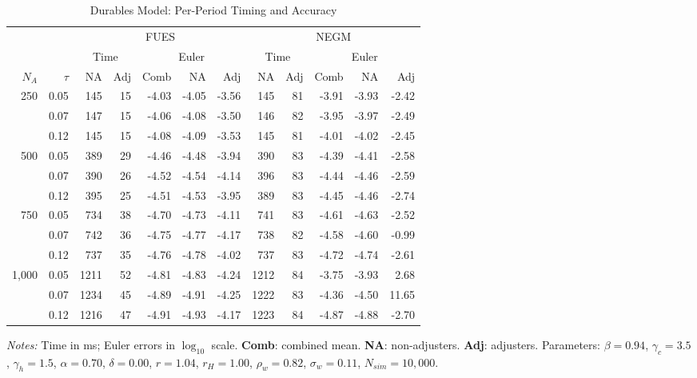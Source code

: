 \documentclass{article}
\begin{document}
\begin{table}[htbp]
\centering
\begingroup
\small
\setlength{\tabcolsep}{3pt}
\renewcommand{\arraystretch}{1.05}
\caption{Durables Model: Per-Period Timing and Accuracy}
\label{table:housing1}
\begin{tabular}{@{}rr rrrrr rrrrr@{}}
\toprule
& & \multicolumn{5}{c}{FUES} & \multicolumn{5}{c}{NEGM} \\
\cmidrule(lr){3-7} \cmidrule(lr){8-12}
& & \multicolumn{2}{c}{Time} & \multicolumn{3}{c}{Euler} & \multicolumn{2}{c}{Time} & \multicolumn{3}{c}{Euler} \\
\cmidrule(lr){3-4} \cmidrule(lr){5-7} \cmidrule(lr){8-9} \cmidrule(lr){10-12}
$N_A$ & $\tau$ & NA & Adj & Comb & NA & Adj & NA & Adj & Comb & NA & Adj \\
\midrule
250 & 0.05 & 145 & 15 & -4.03 & -4.05 & -3.56 & 145 & 81 & -3.91 & -3.93 & -2.42 \\
 & 0.07 & 147 & 15 & -4.06 & -4.08 & -3.50 & 146 & 82 & -3.95 & -3.97 & -2.49 \\
 & 0.12 & 145 & 15 & -4.08 & -4.09 & -3.53 & 145 & 81 & -4.01 & -4.02 & -2.45 \\
\midrule
500 & 0.05 & 389 & 29 & -4.46 & -4.48 & -3.94 & 390 & 83 & -4.39 & -4.41 & -2.58 \\
 & 0.07 & 390 & 26 & -4.52 & -4.54 & -4.14 & 396 & 83 & -4.44 & -4.46 & -2.59 \\
 & 0.12 & 395 & 25 & -4.51 & -4.53 & -3.95 & 389 & 83 & -4.45 & -4.46 & -2.74 \\
\midrule
750 & 0.05 & 734 & 38 & -4.70 & -4.73 & -4.11 & 741 & 83 & -4.61 & -4.63 & -2.52 \\
 & 0.07 & 742 & 36 & -4.75 & -4.77 & -4.17 & 738 & 82 & -4.58 & -4.60 & -0.99 \\
 & 0.12 & 737 & 35 & -4.76 & -4.78 & -4.02 & 737 & 83 & -4.72 & -4.74 & -2.61 \\
\midrule
1,000 & 0.05 & 1211 & 52 & -4.81 & -4.83 & -4.24 & 1212 & 84 & -3.75 & -3.93 & 2.68 \\
 & 0.07 & 1234 & 45 & -4.89 & -4.91 & -4.25 & 1222 & 83 & -4.36 & -4.50 & 11.65 \\
 & 0.12 & 1216 & 47 & -4.91 & -4.93 & -4.17 & 1223 & 84 & -4.87 & -4.88 & -2.70 \\
\bottomrule
\end{tabular}
\vspace{0.3em}
\par\small \textit{Notes:} Time in ms; Euler errors in $\log_{10}$ scale. \textbf{Comb}: combined mean. \textbf{NA}: non-adjusters. \textbf{Adj}: adjusters. Parameters: $\beta=0.94$, $\gamma_c=3.5$, $\gamma_h=1.5$, $\alpha=0.70$, $\delta=0.00$, $r=1.04$, $r_H=1.00$, $\rho_w=0.82$, $\sigma_w=0.11$, $N_{sim}=10,000$.
\endgroup
\end{table}
\end{document}
